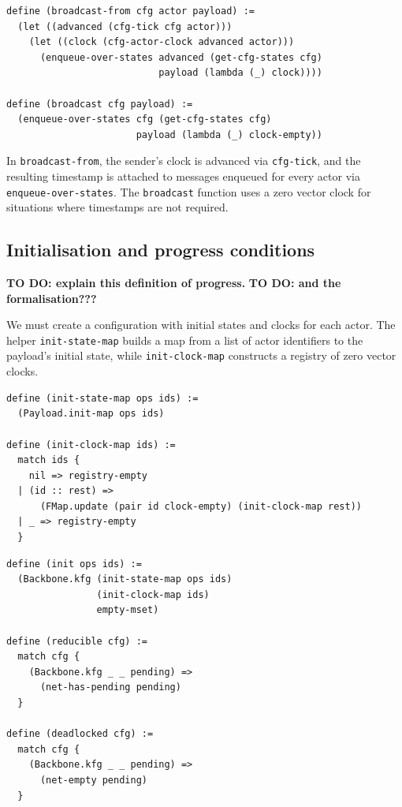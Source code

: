 \begin{lstlisting}[language=Athena,style=athena]
define (broadcast-from cfg actor payload) :=
  (let ((advanced (cfg-tick cfg actor)))
    (let ((clock (cfg-actor-clock advanced actor)))
      (enqueue-over-states advanced (get-cfg-states cfg)
                           payload (lambda (_) clock))))

define (broadcast cfg payload) :=
  (enqueue-over-states cfg (get-cfg-states cfg)
                       payload (lambda (_) clock-empty))
\end{lstlisting}

In \lstinline{broadcast-from}, the sender's clock is advanced via \lstinline{cfg-tick}, and the resulting timestamp is attached to messages enqueued for every actor via \lstinline{enqueue-over-states}.  
The \lstinline{broadcast} function uses a zero vector clock for situations where timestamps are not required.

\subsection{Initialisation and progress conditions}

\textbf{TO DO: explain this definition of progress.}  
\textbf{TO DO: and the formalisation???}

We must create a configuration with initial states and clocks for each actor.  
The helper \lstinline{init-state-map} builds a map from a list of actor identifiers to the payload’s initial state,  
while \lstinline{init-clock-map} constructs a registry of zero vector clocks.  

\begin{lstlisting}[language=Athena,style=athena]
define (init-state-map ops ids) :=
  (Payload.init-map ops ids)

define (init-clock-map ids) :=
  match ids {
    nil => registry-empty
  | (id :: rest) =>
      (FMap.update (pair id clock-empty) (init-clock-map rest))
  | _ => registry-empty
  }
\end{lstlisting}

\begin{lstlisting}[language=Athena,style=athena]
define (init ops ids) :=
  (Backbone.kfg (init-state-map ops ids) 
                (init-clock-map ids) 
                empty-mset)

define (reducible cfg) :=
  match cfg {
    (Backbone.kfg _ _ pending) =>
      (net-has-pending pending)
  }

define (deadlocked cfg) :=
  match cfg {
    (Backbone.kfg _ _ pending) =>
      (net-empty pending)
  }
\end{lstlisting}

